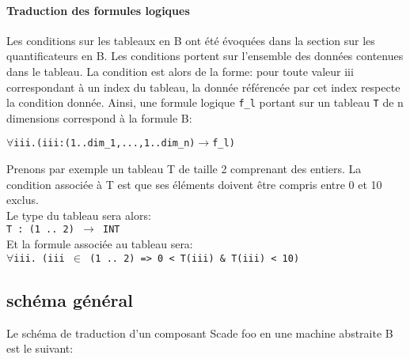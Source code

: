 \paragraph{Traduction des formules logiques}
Les conditions sur les tableaux en B ont été évoquées dans la section sur les
quantificateurs en B. Les conditions portent sur l'ensemble des données
contenues dans le tableau. La condition est alors de la forme: pour toute valeur
iii correspondant à un index du tableau, la donnée référencée par cet index
respecte la condition donnée. Ainsi, une formule logique \texttt{f\_l} portant sur un
tableau \texttt{T} de n dimensions correspond à la formule B: 
\begin{alltt}
\(\forall \)iii. (iii : (1..dim_1, ..., 1..dim_n) \(\rightarrow\) f\_l)
\end{alltt}

Prenons par exemple un tableau T de taille 2 comprenant des entiers. La condition
associée à T est que ses éléments doivent être compris entre 0 et 10 exclus.\\
Le type du tableau sera alors: \\
\texttt{T : (1 .. 2) $\rightarrow$ INT }\\
Et la formule associée au tableau sera: \\
\texttt{$\forall$iii. (iii $\in$ (1 .. 2) => 0 < T(iii) \& T(iii) < 10)}

\subsection{schéma général}

Le schéma de traduction d'un composant Scade foo en une machine abstraite B est
le suivant:

